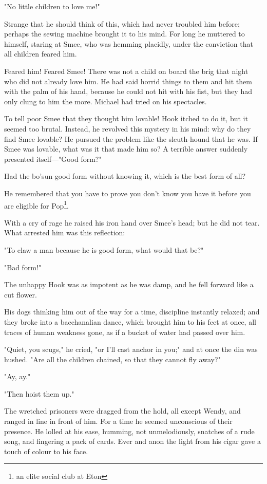 "No little children to love me!"


Strange that he should think of this, which had never troubled him before;
perhaps the sewing machine brought it to his mind. For long he muttered to
himself, staring at Smee, who was hemming placidly, under the conviction
that all children feared him.


Feared him! Feared Smee! There was not a child on board the brig that
night who did not already love him. He had said horrid things to them and
hit them with the palm of his hand, because he could not hit with his
fist, but they had only clung to him the more. Michael had tried on his
spectacles.


To tell poor Smee that they thought him lovable! Hook itched to do it, but
it seemed too brutal. Instead, he revolved this mystery in his mind: why
do they find Smee lovable? He pursued the problem like the sleuth-hound
that he was. If Smee was lovable, what was it that made him so? A terrible
answer suddenly presented itself—"Good form?"


Had the bo'sun good form without knowing it, which is the best form of
all?


He remembered that you have to prove you don't know you have it before you
are eligible for Pop\footnote{an elite social club at Eton}.


With a cry of rage he raised his iron hand over Smee's head; but he did
not tear. What arrested him was this reflection:


"To claw a man because he is good form, what would that be?"


"Bad form!"


The unhappy Hook was as impotent as he was damp, and he fell
forward like a cut flower.


His dogs thinking him out of the way for a time, discipline instantly
relaxed; and they broke into a bacchanalian dance, which brought
him to his feet at once, all traces of human weakness gone, as if a bucket
of water had passed over him.


"Quiet, you scugs," he cried, "or I'll cast anchor in you;" and at once
the din was hushed. "Are all the children chained, so that they cannot fly
away?"


"Ay, ay."


"Then hoist them up."


The wretched prisoners were dragged from the hold, all except Wendy, and
ranged in line in front of him. For a time he seemed unconscious of their
presence. He lolled at his ease, humming, not unmelodiously, snatches of a
rude song, and fingering a pack of cards. Ever and anon the light from his
cigar gave a touch of colour to his face.


